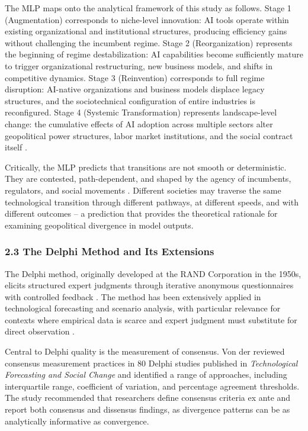 \documentclass{article}
\begin{document}
The MLP maps onto the analytical framework of this study as follows. Stage 1 (Augmentation) corresponds to niche-level innovation: AI tools operate within existing organizational and institutional structures, producing efficiency gains without challenging the incumbent regime. Stage 2 (Reorganization) represents the beginning of regime destabilization: AI capabilities become sufficiently mature to trigger organizational restructuring, new business models, and shifts in competitive dynamics. Stage 3 (Reinvention) corresponds to full regime disruption: AI-native organizations and business models displace legacy structures, and the sociotechnical configuration of entire industries is reconfigured. Stage 4 (Systemic Transformation) represents landscape-level change: the cumulative effects of AI adoption across multiple sectors alter geopolitical power structures, labor market institutions, and the social contract itself \citep{geels2020a, geels2020b, walrave2018mlp}.

Critically, the MLP predicts that transitions are not smooth or deterministic. They are contested, path-dependent, and shaped by the agency of incumbents, regulators, and social movements \citep{geels2020a, kern2012mlppolicy}. Different societies may traverse the same technological transition through different pathways, at different speeds, and with different outcomes -- a prediction that provides the theoretical rationale for examining geopolitical divergence in model outputs.


\subsubsection{2.3 The Delphi Method and Its Extensions}
\label{sec:2_3_the_delphi_method_and_its_extensions}

The Delphi method, originally developed at the RAND Corporation in the 1950s, elicits structured expert judgments through iterative anonymous questionnaires with controlled feedback \citep{gordon2006rtdelphi}. The method has been extensively applied in technological forecasting and scenario analysis, with particular relevance for contexts where empirical data is scarce and expert judgment must substitute for direct observation \citep{culot2020manufacturing, fritschy2019autonomous, stahl2023chatgpt}.

Central to Delphi quality is the measurement of consensus. Von der \citet{gracht2012} reviewed consensus measurement practices in 80 Delphi studies published in \textit{Technological Forecasting and Social Change} and identified a range of approaches, including interquartile range, coefficient of variation, and percentage agreement thresholds. The study recommended that researchers define consensus criteria ex ante and report both consensus and dissensus findings, as divergence patterns can be as analytically informative as convergence.
\end{document}
